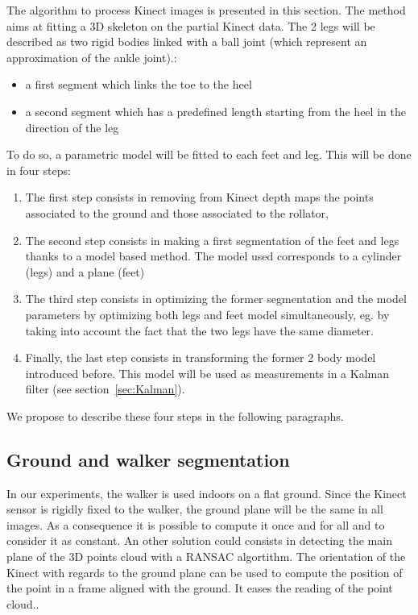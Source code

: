 \documentclass[letterpaper, 10 pt, conference]{ieeeconf}
\newcommand{\CDOK}[2]{{#1}} %
\begin{document}
The algorithm to process Kinect images is presented in this section. \CDOK{The method aims at fitting a 3D skeleton on the partial Kinect data. The 2 legs will be described as two rigid bodies linked with a ball joint (which represent an approximation of the ankle joint).}{The goal of the method is to segment  Kinect points cloud (see Fig.~\ref{fig:KinectFrames}) in two part (left and right) which are composed by}:
\begin{itemize}
	\item a first segment which links the toe to the heel
	\item a second segment which has a predefined length starting from the heel in the direction of the leg
\end{itemize}
\CDOK{To do so}{Moreover}, a \CDOK{parametric}{} model will be \CDOK{fitted}{fit} to each feet and leg. This will be done in four steps:
\begin{enumerate}
	\item The first step consists in removing from Kinect \CDOK{depth maps}{images} the points associated to the ground and those associated to the rollator,
	\item The second step consists in making a first segmentation of the feet and legs thanks to a model based method. The model used corresponds to a cylinder (legs) and a plane (feet)
	\item The third step consists in optimizing the former segmentation and the model parameters by optimizing both legs and feet model simultaneously, eg. by taking into account the fact that the two legs have the same diameter.
	\item Finally, the last step consists in transforming the former 2 body model introduced before. This model will be used as measurements in a Kalman filter (see section~\ref{sec:Kalman}).
\end{enumerate}
We propose to describe these four steps in the following paragraphs.

\subsection{Ground and walker segmentation}
\label{subsec:GroundWalkerSeg}
In our experiments, the walker is used indoors on a flat ground. Since the Kinect sensor is rigidly fixed to the walker, the ground plane will be the same in all images. As a consequence it is possible to compute it once and for all and to consider it as constant. An other solution could consists in detecting the main plane of the 3D points cloud with a RANSAC algortithm. \CDOK{The orientation of the Kinect with regards to the ground plane can be used to compute the position of the point in a frame aligned with the ground. It eases the reading of the point cloud.}{Moreover, a rotation matrix can be defined in order to change its orientation to an horizontal plane. At this step, we assume that the we apply this rotation matrix so that the $\mathbf{z}$ axis in the Kinect frame corresponds to the $\mathbf{z}$ axis of the world}.
\end{document}
